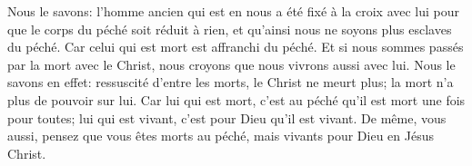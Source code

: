 Nous le savons: l’homme ancien qui est en nous a été fixé à la croix avec lui
	pour que le corps du péché soit réduit à rien,
	et qu’ainsi nous ne soyons plus esclaves du péché.
Car celui qui est mort est affranchi du péché.
Et si nous sommes passés par la mort avec le Christ,
	nous croyons que nous vivrons aussi avec lui.
Nous le savons en effet:
	ressuscité d’entre les morts, le Christ ne meurt plus;
	la mort n’a plus de pouvoir sur lui.
Car lui qui est mort, c’est au péché qu’il est mort une fois pour toutes;
	lui qui est vivant, c’est pour Dieu qu’il est vivant.
De même, vous aussi, pensez que vous êtes morts au péché,
	mais vivants pour Dieu en Jésus Christ.
